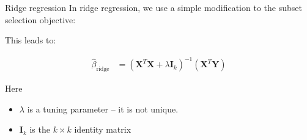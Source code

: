 \documentclass[mathserif, aspectratio=169]{beamer}
\begin{document}
\begin{frame}{Ridge regression}
In ridge regression, we use a simple modification to the subset selection objective:


\pause
This leads to:

\begin{align*}
\hat{\beta}_\text{ridge} &=\left(\mathbf{X}^T\mathbf{X} + \lambda\mathbf{I}_k\right)^{-1} \left(\mathbf{X}^T\mathbf{Y}\right)
\end{align*}

Here 
\begin{itemize}
\item $\lambda$ is a tuning parameter -- it is not unique.  
\item $\mathbf{I}_k$ is the $k\times k$ identity matrix\\~\\
\end{itemize}

\end{frame}
\end{document}
